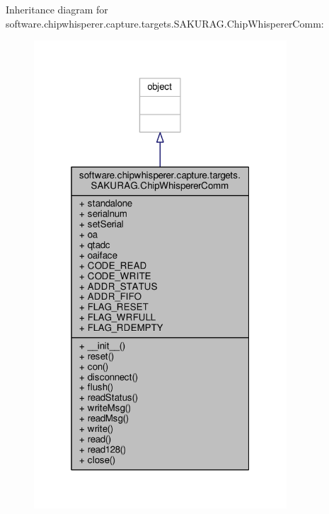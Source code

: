 Inheritance diagram for software.\+chipwhisperer.\+capture.\+targets.\+S\+A\+K\+U\+R\+A\+G.\+Chip\+Whisperer\+Comm\+:\nopagebreak
\begin{figure}[H]
\begin{center}
\leavevmode
\includegraphics[width=268pt]{d1/dfe/classsoftware_1_1chipwhisperer_1_1capture_1_1targets_1_1SAKURAG_1_1ChipWhispererComm__inherit__graph}
\end{center}
\end{figure}


